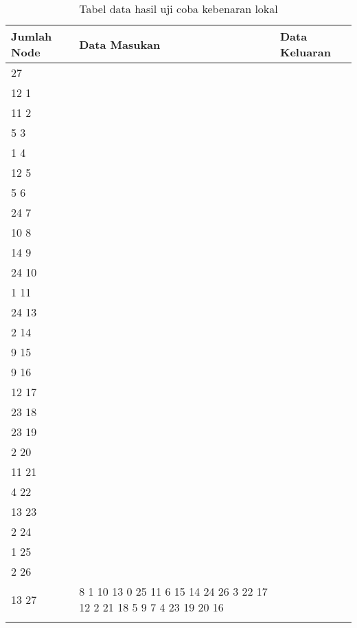 	\begin{longtable}[Ht]{| p{} | p{} | p{} |}
		\hline
		Jumlah Node & Data Masukan                                                                                                                                                                                                                          & Data Keluaran                                                          \\ \hline
	27          & \begin{tabular}[c]{@{}l@{}}27\\ 12 1\\ 11 2\\ 5 3\\ 1 4\\ 12 5\\ 5 6\\ 24 7\\ 10 8\\ 14 9\\ 24 10\\ 1 11\\ 24 13\\ 2 14\\ 9 15\\ 9 16\\ 12 17\\ 23 18\\ 23 19\\ 2 20\\ 11 21\\ 4 22\\ 13 23\\ 2 24\\ 1 25\\ 2 26\\ 13 27\end{tabular} & 8 1 10 13 0 25 11 6 15 14 24 26 3 22 17 12 2 21 18 5 9 7 4 23 19 20 16 \\ \hline
	\caption{Tabel data hasil uji coba kebenaran lokal}
\end{longtable}